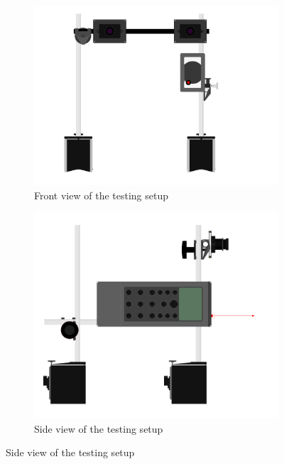 \documentclass[11pt]{article}
\begin{document}
\begin{figure}[p]
	\begin{subfigure}[h]{\textwidth}
		\centering
		\includegraphics[width=\textwidth]{images/camera-setup.pdf}
		\caption{Front view of the testing setup}
		\label{fig:setup-front}
	\end{subfigure}
	
	\begin{subfigure}[h]{\textwidth}
		\centering
		\includegraphics[width=\textwidth]{images/camera-setup-side.pdf}
		\caption{Side view of the testing setup}
		\label{fig:setup-side}
	\end{subfigure}
\end{figure}
\end{document}

